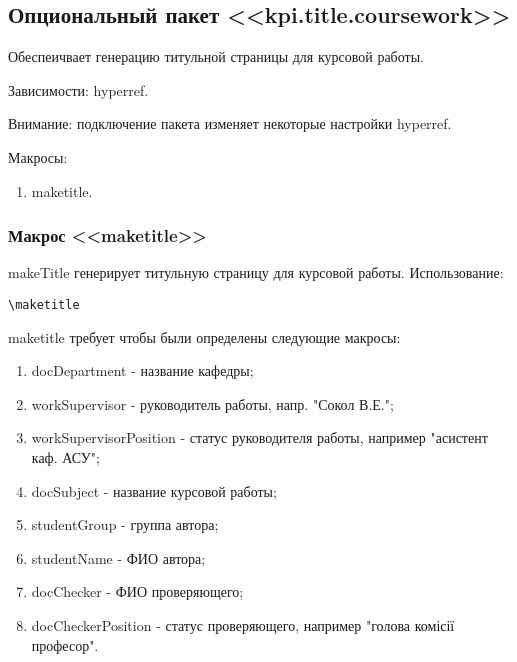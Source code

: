 \subsection{Опциональный пакет <<kpi.title.coursework>>}
Обеспеичвает генерацию титульной страницы для курсовой работы.\par
Зависимости: hyperref.\par
Внимание: подключение пакета изменяет некоторые настройки hyperref.\par
Макросы:
\begin{enumerate}
\item maketitle.
\end{enumerate}
\subsubsection{Макрос <<maketitle>>}
makeTitle генерирует титульную страницу для курсовой работы.
Использование:{\small
\begin{verbatim}
\maketitle
\end{verbatim}}
\normalsize
maketitle требует чтобы были определены следующие макросы:
\begin{enumerate}
\item docDepartment - название кафедры;
\item workSupervisor - руководитель работы, напр. "Сокол В.Е.";
\item workSupervisorPosition - статус руководителя работы, например "асистент каф. АСУ";
\item docSubject - название курсовой работы;
\item studentGroup - группа автора;
\item studentName - ФИО автора;
\item docChecker - ФИО проверяющего;
\item docCheckerPosition - статус проверяющего, например "голова комісії професор".
\end{enumerate}

